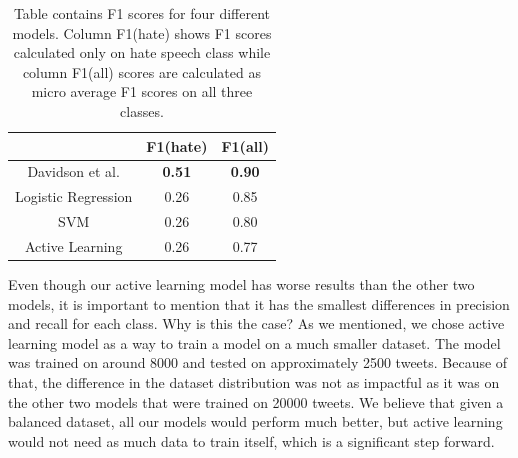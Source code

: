 \documentclass[10pt, a4paper]{article}
\begin{document}
	\begin{table}[!ht]
		\centering
		\caption{Table contains F1 scores for four different models. Column F1(hate) shows F1 scores calculated only on hate speech class while column F1(all) scores are calculated as micro average F1 scores on all three classes.}
		\label{tbl:scoreAll}
		\begin{tabular}{ccc}
			\hline
			\multicolumn{1}{l}{} & \multicolumn{1}{l}{F1(hate)} & \multicolumn{1}{l}{F1(all)} \\ \hline
			Davidson et al.      & \textbf{0.51}                & \textbf{0.90}               \\ \hline
			Logistic Regression  & 0.26                         & 0.85                        \\ \hline
			SVM                  & 0.26                         & 0.80                        \\ \hline
			Active Learning      & 0.26                         & 0.77                        \\ \hline
		\end{tabular}
	\end{table}
	Even though our active learning model has worse results than the other two models, it is important to mention that it has the smallest differences in precision and recall for each class. Why is this the case? As we mentioned, we chose active learning model as a way to train a model on a much smaller dataset. The model was trained on around 8000 and tested on approximately 2500 tweets. Because of that, the difference in the dataset distribution was not as impactful as it was on the other two models that were trained on 20000 tweets. We believe that given a balanced dataset, all our models would perform much better, but active learning would not need as much data to train itself, which is a significant step forward.
	
\end{document}
